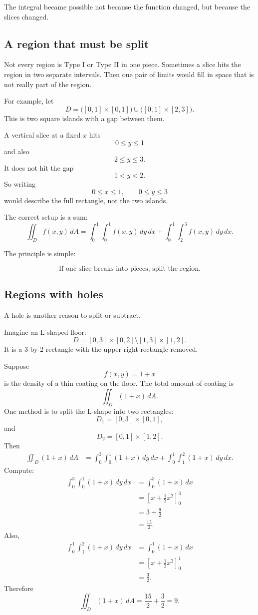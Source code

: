 The integral became possible not because the function changed, but because the slices
changed.

\subsection{A region that must be split}

Not every region is Type I or Type II in one piece.  Sometimes a slice hits the region in
two separate intervals.  Then one pair of limits would fill in space that is not really part
of the region.

For example, let
\[
    D=
    \bigl([0,1]\times[0,1]\bigr)
    \cup
    \bigl([0,1]\times[2,3]\bigr).
\]
This is two square islands with a gap between them.

A vertical slice at a fixed \(x\) hits
\[
    0\le y\le1
\]
and also
\[
    2\le y\le3.
\]
It does not hit the gap
\[
    1<y<2.
\]
So writing
\[
    0\le x\le1,
    \qquad
    0\le y\le3
\]
would describe the full rectangle, not the two islands.

The correct setup is a sum:
\[
\boxed{
    \iint_D f(x,y)\,dA
    =
    \int_0^1\int_0^1 f(x,y)\,dy\,dx
    +
    \int_0^1\int_2^3 f(x,y)\,dy\,dx.
}
\]

The principle is simple:

\[
\boxed{
    \text{If one slice breaks into pieces, split the region.}
}
\]

\subsection{Regions with holes}

A hole is another reason to split or subtract.

Imagine an L-shaped floor:
\[
    D=
    [0,3]\times[0,2]
    \setminus
    [1,3]\times[1,2].
\]
It is a \(3\)-by-\(2\) rectangle with the upper-right rectangle removed.

Suppose
\[
    f(x,y)=1+x
\]
is the density of a thin coating on the floor.  The total amount of coating is
\[
    \iint_D (1+x)\,dA.
\]
One method is to split the L-shape into two rectangles:
\[
    D_1=[0,3]\times[0,1],
\]
and
\[
    D_2=[0,1]\times[1,2].
\]
Then
\[
\begin{aligned}
    \iint_D (1+x)\,dA
    &=
    \int_0^3\int_0^1 (1+x)\,dy\,dx
    +
    \int_0^1\int_1^2 (1+x)\,dy\,dx.
\end{aligned}
\]
Compute:
\[
\begin{aligned}
    \int_0^3\int_0^1 (1+x)\,dy\,dx
    &=
    \int_0^3 (1+x)\,dx\\
    &=
    \left[x+\frac12x^2\right]_0^3\\
    &=
    3+\frac92\\
    &=
    \frac{15}{2}.
\end{aligned}
\]
Also,
\[
\begin{aligned}
    \int_0^1\int_1^2 (1+x)\,dy\,dx
    &=
    \int_0^1 (1+x)\,dx\\
    &=
    \left[x+\frac12x^2\right]_0^1\\
    &=
    \frac32.
\end{aligned}
\]
Therefore
\[
\boxed{
    \iint_D (1+x)\,dA
    =
    \frac{15}{2}+\frac32
    =
    9.
}
\]

